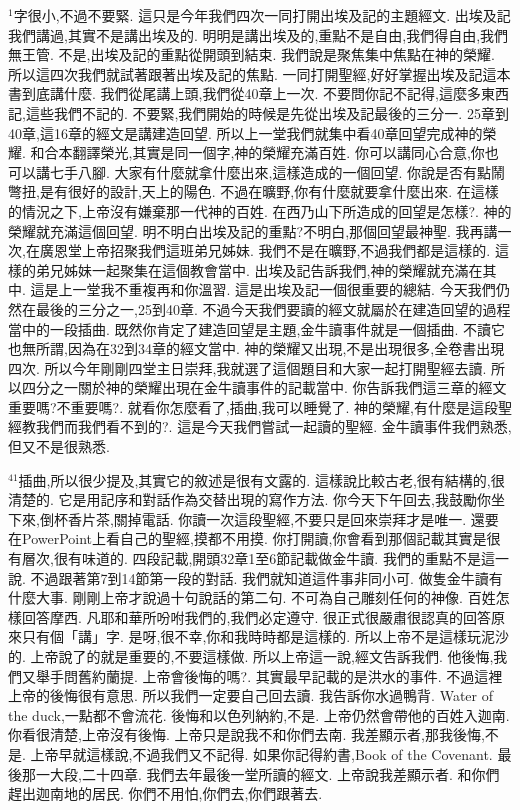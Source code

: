 \documentclass{book}
\begin{document}
$^{1}$字很小,不過不要緊.
這只是今年我們四次一同打開出埃及記的主題經文.
出埃及記我們講過,其實不是講出埃及的.
明明是講出埃及的,重點不是自由,我們得自由,我們無王管.
不是,出埃及記的重點從開頭到結束.
我們說是聚焦集中焦點在神的榮耀.
所以這四次我們就試著跟著出埃及記的焦點.
一同打開聖經,好好掌握出埃及記這本書到底講什麼.
我們從尾講上頭,我們從40章上一次.
不要問你記不記得,這麼多東西記,這些我們不記的.
不要緊,我們開始的時候是先從出埃及記最後的三分一.
25章到40章,這16章的經文是講建造回望.
所以上一堂我們就集中看40章回望完成神的榮耀.
和合本翻譯榮光,其實是同一個字,神的榮耀充滿百姓.
你可以講同心合意,你也可以講七手八腳.
大家有什麼就拿什麼出來,這樣造成的一個回望.
你說是否有點鬧彆扭,是有很好的設計,天上的陽色.
不過在曠野,你有什麼就要拿什麼出來.
在這樣的情況之下,上帝沒有嫌棄那一代神的百姓.
在西乃山下所造成的回望是怎樣?.
神的榮耀就充滿這個回望.
明不明白出埃及記的重點?不明白,那個回望最神聖.
我再講一次,在廣恩堂上帝招聚我們這班弟兄姊妹.
我們不是在曠野,不過我們都是這樣的.
這樣的弟兄姊妹一起聚集在這個教會當中.
出埃及記告訴我們,神的榮耀就充滿在其中.
這是上一堂我不重複再和你溫習.
這是出埃及記一個很重要的總結.
今天我們仍然在最後的三分之一,25到40章.
不過今天我們要讀的經文就屬於在建造回望的過程當中的一段插曲.
既然你肯定了建造回望是主題,金牛讀事件就是一個插曲.
不讀它也無所謂,因為在32到34章的經文當中.
神的榮耀又出現,不是出現很多,全卷書出現四次.
所以今年剛剛四堂主日崇拜,我就選了這個題目和大家一起打開聖經去讀.
所以四分之一關於神的榮耀出現在金牛讀事件的記載當中.
你告訴我們這三章的經文重要嗎?不重要嗎?.
就看你怎麼看了,插曲,我可以睡覺了.
神的榮耀,有什麼是這段聖經教我們而我們看不到的?.
這是今天我們嘗試一起讀的聖經.
金牛讀事件我們熟悉,但又不是很熟悉.

$^{41}$插曲,所以很少提及,其實它的敘述是很有文露的.
這樣說比較古老,很有結構的,很清楚的.
它是用記序和對話作為交替出現的寫作方法.
你今天下午回去,我鼓勵你坐下來,倒杯香片茶,關掉電話.
你讀一次這段聖經,不要只是回來崇拜才是唯一.
還要在PowerPoint上看自己的聖經,摸都不用摸.
你打開讀,你會看到那個記載其實是很有層次,很有味道的.
四段記載,開頭32章1至6節記載做金牛讀.
我們的重點不是這一說.
不過跟著第7到14節第一段的對話.
我們就知道這件事非同小可.
做隻金牛讀有什麼大事.
剛剛上帝才說過十句說話的第二句.
不可為自己雕刻任何的神像.
百姓怎樣回答摩西.
凡耶和華所吩咐我們的,我們必定遵守.
很正式很嚴肅很認真的回答原來只有個「講」字.
是呀,很不幸,你和我時時都是這樣的.
所以上帝不是這樣玩泥沙的.
上帝說了的就是重要的,不要這樣做.
所以上帝這一說,經文告訴我們.
他後悔,我們又舉手問舊約蘭提.
上帝會後悔的嗎?.
其實最早記載的是洪水的事件.
不過這裡上帝的後悔很有意思.
所以我們一定要自己回去讀.
我告訴你水過鴨背.
Water of the duck,一點都不會流花.
後悔和以色列納約,不是.
上帝仍然會帶他的百姓入迦南.
你看很清楚,上帝沒有後悔.
上帝只是說我不和你們去南.
我差顯示者,那我後悔,不是.
上帝早就這樣說,不過我們又不記得.
如果你記得約書,Book of the Covenant.
最後那一大段,二十四章.
我們去年最後一堂所讀的經文.
上帝說我差顯示者.
和你們趕出迦南地的居民.
你們不用怕,你們去,你們跟著去.
\end{document}

